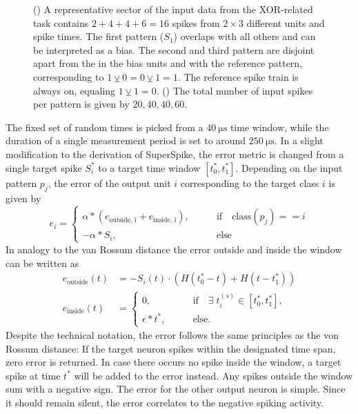\begin{figure}	
	\begin{subfigure}{0.5\textwidth}
		\caption{}
		
		\label{superspiketaskpicturesector}
	\end{subfigure}
	\begin{subfigure}{0.5\textwidth}
		\caption{}
		
		\label{superspiketaskpicture}
	\end{subfigure}
	\caption{() A representative sector of the input data from the XOR-related task contains $2 + 4 + 4 + 6 = 16$ spikes from $2\times3$ different units and spike times. The first pattern ($S_1$) overlaps with all others and can be interpreted as a bias. The second and third pattern are disjoint apart from the  in the bias units and with the reference pattern, corresponding to $1 \veebar 0 = 0 \veebar 1 = 1$. The reference spike train is always on, equaling $1 \veebar 1 = 0$. () The total number of input spikes per pattern is given by $20, 40, 40, 60$.
	\label{superspiketaskoverview}}
\end{figure} 

The fixed set of random times is picked from a $\SI{40}{\micro \s}$ time window, while the duration of a single measurement period is set to around $\SI{250}{\micro \s}$. In a slight modification to the derivation of SuperSpike, the error metric is changed from a single target spike $S_i^*$ to a target time window $[t^*_0, t^*_1]$. Depending on the input pattern $p_j$, the error of the output unit $i$ corresponding to the target class $i$ is given by
\begin{equation}
e_i = \begin{cases}
\alpha \ast \left(e_\text{outside, i} + e_\text{inside, i}\right),& \quad \quad \text{if} \quad \text{class}(p_j) == i \\
- \alpha \ast S_i,& \quad \quad \text{else} 
\end{cases}
\label{superspikeerror}
\end{equation}
In analogy to the van Rossum distance the error outside and inside the window can be written as 
\begin{align*}
e_\text{outside}(t) &= - S_i(t) \cdot \left(H(t^*_0 - t) + H(t - t^*_1)\right) \\
e_\text{inside}(t) &= 
\begin{cases}
0 ,&\quad \quad \text{if} \quad \exists \; t^{(s)}_i \in [t^*_0, t^*_1], \\
\epsilon \ast t^* ,& \quad \quad \text{else}.
\end{cases}
\end{align*}
Despite the technical notation, the error follows the same principles as the von Rossum distance: If the target neuron spikes within the designated time span, zero error is returned. In case there occurs no spike inside the window, a target spike at time $t^*$ will be added to the error instead. Any spikes outside the window sum with a negative sign. The error for the other output neuron is simple. Since it should remain silent, the error correlates to the negative spiking activity.

